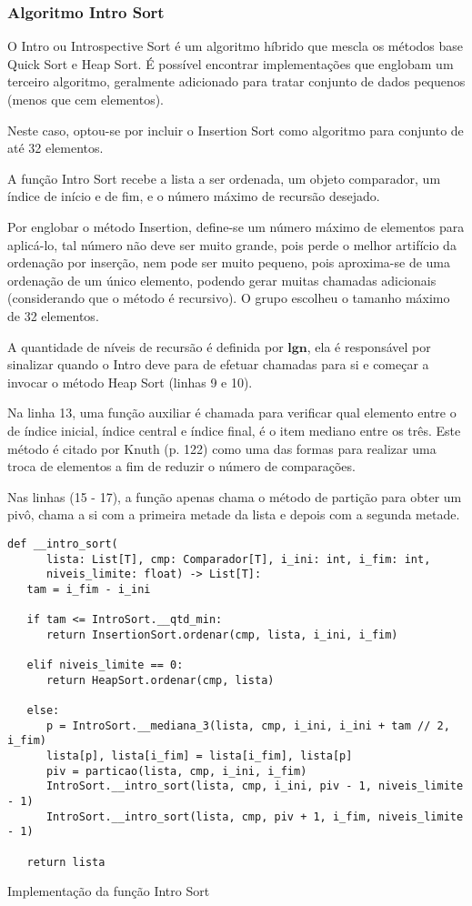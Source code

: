 \documentclass[a4paper,12pt]{scrartcl}
\begin{document}
\subsubsection{Algoritmo Intro Sort}

O Intro ou Introspective Sort é um algoritmo híbrido que mescla os métodos base Quick Sort e Heap Sort\cite{musser}. É possível encontrar implementações que englobam um terceiro algoritmo, geralmente adicionado para tratar conjunto de dados pequenos (menos que cem elementos).

Neste caso, optou-se por incluir o Insertion Sort como algoritmo para conjunto de até 32 elementos.

A função Intro Sort recebe a lista a ser ordenada, um objeto comparador, um índice de início e de fim, e o número máximo de recursão desejado.

Por englobar o método Insertion, define-se um número máximo de elementos para aplicá-lo, tal número não deve ser muito grande, pois perde o melhor artifício da ordenação por inserção, nem pode ser muito pequeno, pois aproxima-se de uma ordenação de um único elemento, podendo gerar muitas chamadas adicionais (considerando que o método é recursivo). O grupo escolheu o tamanho máximo de 32 elementos.

A quantidade de níveis de recursão é definida por $\boldsymbol{lg n}$, ela é responsável por sinalizar quando o Intro deve para de efetuar chamadas para si e começar a invocar o método Heap Sort (linhas 9 e 10).

Na linha 13, uma função auxiliar é chamada para verificar qual elemento entre o de índice inicial, índice central e índice final, é o item mediano entre os três. Este método é citado por Knuth (p. 122) como uma das formas para realizar uma troca de elementos a fim de reduzir o número de comparações.

Nas linhas (15 - 17), a função apenas chama o método de partição para obter um pivô, chama a si com a primeira metade da lista e depois com a segunda metade.

\begin{listing}[H]
\begin{verbatim}
def __intro_sort(
      lista: List[T], cmp: Comparador[T], i_ini: int, i_fim: int,
      niveis_limite: float) -> List[T]:
   tam = i_fim - i_ini

   if tam <= IntroSort.__qtd_min:
      return InsertionSort.ordenar(cmp, lista, i_ini, i_fim)

   elif niveis_limite == 0:
      return HeapSort.ordenar(cmp, lista)

   else:
      p = IntroSort.__mediana_3(lista, cmp, i_ini, i_ini + tam // 2, i_fim)
      lista[p], lista[i_fim] = lista[i_fim], lista[p]
      piv = particao(lista, cmp, i_ini, i_fim)
      IntroSort.__intro_sort(lista, cmp, i_ini, piv - 1, niveis_limite - 1)
      IntroSort.__intro_sort(lista, cmp, piv + 1, i_fim, niveis_limite - 1)

   return lista
\end{verbatim}
\caption{\footnotesize{Implementação da função Intro Sort}}
\end{listing}
\end{document}
